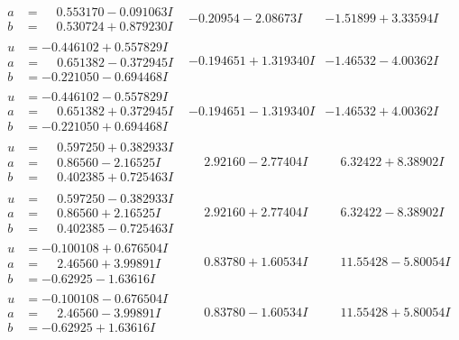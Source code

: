 \documentclass[1p]{elsarticle_modified}
\theoremstyle{definition}
\begin{document}
$$\begin{array}{c|c|c}
\begin{aligned}
a &= \phantom{-}0.553170 - 0.091063 I \\
b &= \phantom{-}0.530724 + 0.879230 I\end{aligned}
 & -0.20954 - 2.08673 I & -1.51899 + 3.33594 I \\ \hline\begin{aligned}
u &= -0.446102 + 0.557829 I \\
a &= \phantom{-}0.651382 - 0.372945 I \\
b &= -0.221050 - 0.694468 I\end{aligned}
 & -0.194651 + 1.319340 I & -1.46532 - 4.00362 I \\ \hline\begin{aligned}
u &= -0.446102 - 0.557829 I \\
a &= \phantom{-}0.651382 + 0.372945 I \\
b &= -0.221050 + 0.694468 I\end{aligned}
 & -0.194651 - 1.319340 I & -1.46532 + 4.00362 I \\ \hline\begin{aligned}
u &= \phantom{-}0.597250 + 0.382933 I \\
a &= \phantom{-}0.86560 - 2.16525 I \\
b &= \phantom{-}0.402385 + 0.725463 I\end{aligned}
 & \phantom{-}2.92160 - 2.77404 I & \phantom{-}6.32422 + 8.38902 I \\ \hline\begin{aligned}
u &= \phantom{-}0.597250 - 0.382933 I \\
a &= \phantom{-}0.86560 + 2.16525 I \\
b &= \phantom{-}0.402385 - 0.725463 I\end{aligned}
 & \phantom{-}2.92160 + 2.77404 I & \phantom{-}6.32422 - 8.38902 I \\ \hline\begin{aligned}
u &= -0.100108 + 0.676504 I \\
a &= \phantom{-}2.46560 + 3.99891 I \\
b &= -0.62925 - 1.63616 I\end{aligned}
 & \phantom{-}0.83780 + 1.60534 I & \phantom{-}11.55428 - 5.80054 I \\ \hline\begin{aligned}
u &= -0.100108 - 0.676504 I \\
a &= \phantom{-}2.46560 - 3.99891 I \\
b &= -0.62925 + 1.63616 I\end{aligned}
 & \phantom{-}0.83780 - 1.60534 I & \phantom{-}11.55428 + 5.80054 I \\ \hline\begin{aligned}

\end{aligned}
\end{array}$$
\end{document}
